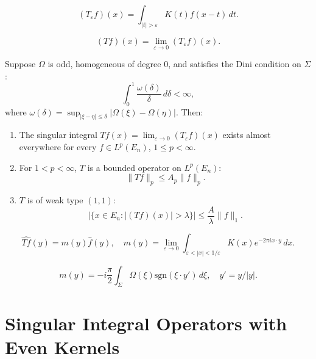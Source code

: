 \begin{equation}\label{eq:c6-2-4}
(T_\varepsilon f)(x) = \int_{|t| > \varepsilon} K(t) f(x - t)\,dt.
\end{equation}

\begin{equation}\label{eq:c6-2-5}
(T f)(x) = \lim_{\varepsilon \to 0} (T_\varepsilon f)(x).
\end{equation}

\begin{theorem}\label{thm:c6-2-6}
Suppose $\Omega$ is odd, homogeneous of degree $0$, and satisfies the Dini condition on $\Sigma$:
\[
\int_0^1 \frac{\omega(\delta)}{\delta}\,d\delta < \infty,
\]
where $\omega(\delta) = \sup_{|\xi - \eta| \leq \delta} |\Omega(\xi) - \Omega(\eta)|$. Then:
\begin{enumerate}
\item[(a)] The singular integral $Tf(x) = \lim_{\varepsilon \to 0} (T_\varepsilon f)(x)$ exists almost everywhere for every $f \in L^p(E_n)$, $1 \leq p < \infty$.
\item[(b)] For $1 < p < \infty$, $T$ is a bounded operator on $L^p(E_n)$:
\begin{equation}\label{eq:c6-2-7}
\|Tf\|_p \leq A_p \|f\|_p.
\end{equation}
\item[(c)] $T$ is of weak type $(1, 1)$:
\begin{equation}\label{eq:c6-2-8}
|\{x \in E_n : |(Tf)(x)| > \lambda\}| \leq \frac{A}{\lambda} \|f\|_1.
\end{equation}
\end{enumerate}
\end{theorem}

\begin{equation}\label{eq:c6-2-9}
\widehat{Tf}(y) = m(y) \hat{f}(y), \quad m(y) = \lim_{\varepsilon \to 0} \int_{\varepsilon < |x| < 1/\varepsilon} K(x) e^{-2\pi i x \cdot y}\,dx.
\end{equation}

\begin{equation}\label{eq:c6-2-10}
m(y) = -i \frac{\pi}{2} \int_\Sigma \Omega(\xi) \text{sgn}(\xi \cdot y')\,d\xi, \quad y' = y/|y|.
\end{equation}

\section{Singular Integral Operators with Even Kernels}


